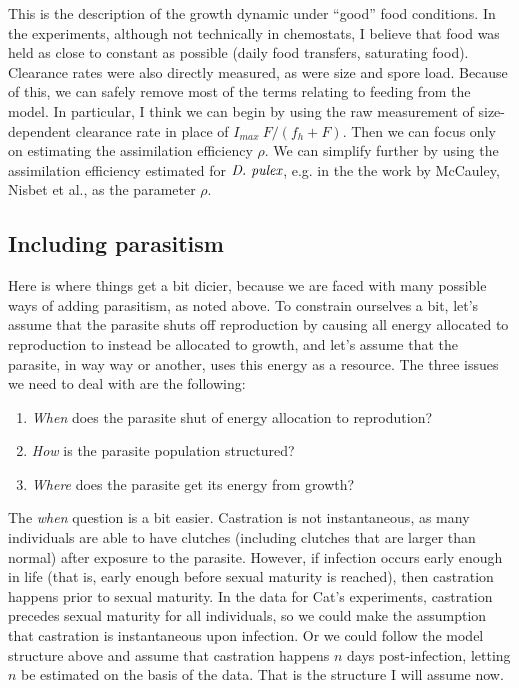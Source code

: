 \documentclass[11pt,reqno,final,pdftex]{amsart}\usepackage[]{graphicx}\usepackage[]{color}
\theoremstyle{plain}
\numberwithin{equation}{part}
\begin{document}
This is the description of the growth dynamic under ``good'' food conditions.
In the experiments, although not technically in chemostats, I believe that food was held as close to constant as possible (daily food transfers, saturating food).
Clearance rates were also directly measured, as were size and spore load.
Because of this, we can safely remove most of the terms relating to feeding from the model.
In particular, I think we can begin by using the raw measurement of size-dependent clearance rate in place of $I_{max}~F/(f_h+F)$.
Then we can focus only on estimating the assimilation efficiency $\rho$.
We can simplify further by using the assimilation efficiency estimated for $\emph{D. pulex}$, e.g. in the the work by McCauley, Nisbet et al., as the parameter $\rho$.

\subsection*{Including parasitism}
Here is where things get a bit dicier, because we are faced with many possible ways of adding parasitism, as noted above.
To constrain ourselves a bit, let's assume that the parasite shuts off reproduction by causing all energy allocated to reproduction to instead be allocated to growth, and let's assume that the parasite, in way way or another, uses this energy as a resource.
The three issues we need to deal with are the following:
\begin{enumerate}
\item \emph{When} does the parasite shut of energy allocation to reprodution?
\item \emph{How} is the parasite population structured?
\item \emph{Where} does the parasite get its energy from growth?
\end{enumerate}

The \emph{when} question is a bit easier.
Castration is not instantaneous, as many individuals are able to have clutches (including clutches that are larger than normal) after exposure to the parasite.
However, if infection occurs early enough in life (that is, early enough before sexual maturity is reached), then castration happens prior to sexual maturity.
In the data for Cat's experiments, castration precedes sexual maturity for all individuals, so we could make the assumption that castration is instantaneous upon infection.
Or we could follow the model structure above and assume that castration happens $n$ days post-infection, letting $n$ be estimated on the basis of the data.
That is the structure I will assume now.
\end{document}
